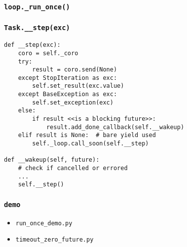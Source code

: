 \documentclass[compress,usenames,dvipsnames]{beamer}
\begin{document}
\begin{frame}[plain]
    \frametitle{\lstinline{loop._run_once()}}
    \begin{algorithm}[H]
        \SetAlgoNoEnd
        \DontPrintSemicolon
    \end{algorithm}
\end{frame}

\begin{frame}
    \frametitle{\lstinline{Task.__step(exc)}}
    \scriptsize
    \begin{lstlisting}
def __step(exc):
    coro = self._coro
    try:
        result = coro.send(None)
    except StopIteration as exc:
        self.set_result(exc.value)
    except BaseException as exc:
        self.set_exception(exc)
    else:
        if result <<is a blocking future>>:
            result.add_done_callback(self.__wakeup)
    elif result is None:  # bare yield used
        self._loop.call_soon(self.__step)

def __wakeup(self, future):
    # check if cancelled or errored
    ...
    self.__step()
    \end{lstlisting}
\end{frame}

\begin{frame}[plain]
    \frametitle{\lstinline{demo}}
    \begin{itemize}
        \item \lstinline{run_once_demo.py}
        \item \lstinline{timeout_zero_future.py}
    \end{itemize}

\end{frame}
\end{document}
